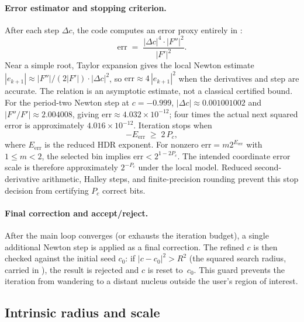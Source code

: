 \paragraph{Error estimator and stopping criterion.}
After each step $\Delta c$, the code computes an error proxy entirely in
:
\begin{equation}\label{eq:ff-err}
\mathrm{err} \;=\;
  \frac{|\Delta c|^4 \cdot |F''|^2}{|F'|^2}.
\end{equation}
Near a simple root, Taylor expansion gives the local Newton estimate
$|e_{k+1}| \approx |F''|/(2|F'|) \cdot |\Delta c|^2$,
so $\mathrm{err} \approx 4\,|e_{k+1}|^2$ when the derivatives and step
are accurate.  The relation is an asymptotic estimate, not a classical
certified bound.  For the period-two Newton step at $c=-0.999$,
$|\Delta c|\approx0.001001002$ and $|F''/F'|\approx2.004008$,
giving $\mathrm{err}\approx4.032\times10^{-12}$; four times the actual
next squared error is approximately $4.016\times10^{-12}$.
Iteration stops when
\begin{equation}\label{eq:ff-stop}
-E_{\mathrm{err}} \;\ge\; 2\,P_c,
\end{equation}
where $E_{\mathrm{err}}$ is the reduced HDR exponent.  For nonzero
$\mathrm{err}=m2^{E_{\mathrm{err}}}$ with $1\le m<2$, the selected bin
implies $\mathrm{err}<2^{1-2P_c}$.  The intended coordinate error scale
is therefore approximately $2^{-P_c}$ under the local model.  Reduced
second-derivative arithmetic, Halley steps, and finite-precision rounding
prevent this stop decision from certifying $P_c$ correct bits.

\paragraph{Final correction and accept/reject.}
After the main loop converges (or exhausts the iteration budget), a single
additional Newton step is applied as a final correction.  The refined $c$ is
then checked against the initial seed $c_0$: if
$|c - c_0|^2 > R^2$ (the squared search radius, carried in ),
the result is rejected and $c$ is reset to~$c_0$.  This guard prevents the
iteration from wandering to a distant nucleus outside the user's region of
interest.

\subsection{Intrinsic radius and scale}
\label{subsec:ff-intrinsic-radius}

